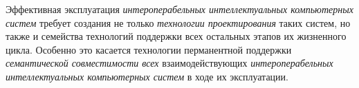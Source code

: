 Эффективная эксплуатация \textit{интероперабельных интеллектуальных компьютерных систем} требует создания не только \textit{технологии проектирования} таких систем, но также и семейства технологий поддержки всех остальных этапов их жизненного цикла. Особенно это касается технологии перманентной поддержки \textit{семантической совместимости всех} взаимодействующих \textit{интероперабельных интеллектуальных компьютерных систем} в ходе их эксплуатации.

%
